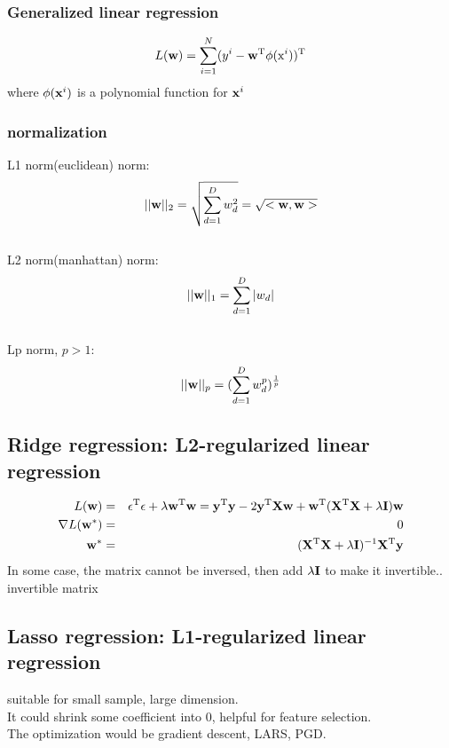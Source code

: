 \documentclass[12pt,a4paper]{article}
\begin{document}
\subsubsection*{Generalized linear regression}
$$
L({\bf w}) = \sum_{i=1}^{N}(y^i-{\bf w}^{\rm T}\phi({\rm x}^i))^{\rm T}
$$
where $\phi({\bf x}^i)$ is a polynomial function for ${\bf x}^i$
\subsubsection*{normalization}
L1 norm(euclidean) norm:
$$
||{\bf w}||_2 = \sqrt{\sum_{d=1}^{D}w_d^2}=\sqrt{<{\bf w},{\bf w}>}
$$\\
L2 norm(manhattan) norm:
$$
||{\bf w}||_1 = \sum_{d=1}^{D}|w_d|
$$\\
Lp norm, $p>1$:
$$
||{\bf w}||_p =(\sum_{d=1}^{D}w^p_d)^{\frac{1}{p}} 
$$
\subsection*{Ridge regression: L2-regularized linear regression}
\begin{eqnarray*}
L({\bf w}) &=& {\bf \epsilon}^{\rm T}{\bf \epsilon}+\lambda{\bf w}^{\rm T}{\bf w}={\bf y}^{\rm T}{\bf y}-2{\bf y}^{\rm T}{\bf X}{\bf w}+{\bf w}^{\rm T}({\bf X}^{\rm T}{\bf X}+\lambda{\bf I}){\bf w} \\
\nabla L({\bf w}^*) &=& 0 \\
{\bf w}^* &=& ({\bf X}^{\rm T}{\bf X}+\lambda{\bf I})^{-1}{\bf X}^{\rm T}{\bf y}
\end{eqnarray*}
In some case, the matrix cannot be inversed, then add $\lambda {\bf I}$ to make it invertible..\\
invertible matrix
\subsection*{Lasso regression: L1-regularized linear regression}
suitable for small sample, large dimension.\\
It could shrink some coefficient into 0, helpful for feature selection.\\
The optimization would be gradient descent, LARS, PGD.
\end{document}
